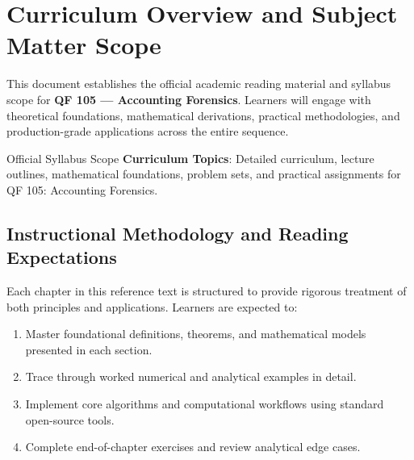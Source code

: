 \section{Curriculum Overview and Subject Matter Scope}

This document establishes the official academic reading material and syllabus scope for \textbf{QF 105 --- Accounting Forensics}. Learners will engage with theoretical foundations, mathematical derivations, practical methodologies, and production-grade applications across the entire sequence.

\begin{InsightBox}{Official Syllabus Scope}
  \textbf{Curriculum Topics}: Detailed curriculum, lecture outlines, mathematical foundations, problem sets, and practical assignments for QF 105: Accounting Forensics.
\end{InsightBox}

\subsection{Instructional Methodology and Reading Expectations}

Each chapter in this reference text is structured to provide rigorous treatment of both principles and applications. Learners are expected to:
\begin{enumerate}
  \item Master foundational definitions, theorems, and mathematical models presented in each section.
  \item Trace through worked numerical and analytical examples in detail.
  \item Implement core algorithms and computational workflows using standard open-source tools.
  \item Complete end-of-chapter exercises and review analytical edge cases.
\end{enumerate}

